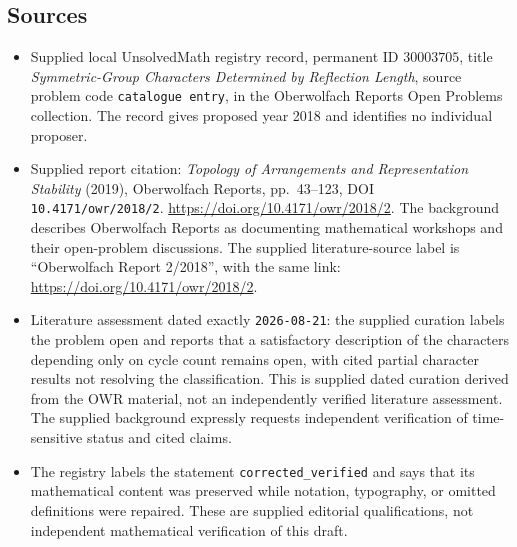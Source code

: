\documentclass[11pt]{article}
\begin{document}
\subsection{Sources}
\begin{itemize}
\item Supplied local UnsolvedMath registry record, permanent ID \(30003705\), title \emph{Symmetric-Group Characters Determined by Reflection Length}, source problem code \texttt{catalogue entry}, in the Oberwolfach Reports Open Problems collection. The record gives proposed year 2018 and identifies no individual proposer.
\item Supplied report citation: \emph{Topology of Arrangements and Representation Stability} (2019), Oberwolfach Reports, pp.~43--123, DOI \texttt{10.4171/owr/2018/2}. \url{https://doi.org/10.4171/owr/2018/2}. The background describes Oberwolfach Reports as documenting mathematical workshops and their open-problem discussions. The supplied literature-source label is ``Oberwolfach Report 2/2018'', with the same link: \url{https://doi.org/10.4171/owr/2018/2}.
\item Literature assessment dated exactly \texttt{2026-08-21}: the supplied curation labels the problem open and reports that a satisfactory description of the characters depending only on cycle count remains open, with cited partial character results not resolving the classification. This is supplied dated curation derived from the OWR material, not an independently verified literature assessment. The supplied background expressly requests independent verification of time-sensitive status and cited claims.
\item The registry labels the statement \texttt{corrected\_verified} and says that its mathematical content was preserved while notation, typography, or omitted definitions were repaired. These are supplied editorial qualifications, not independent mathematical verification of this draft.
\end{itemize}
\end{document}
